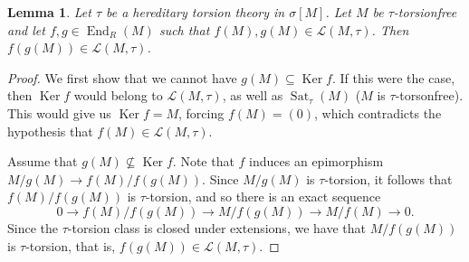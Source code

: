 \documentclass{amsart}
\newtheorem{lemma}[thm]{Lemma}
\newtheorem{cor}[thm]{Corollary}
\theoremstyle{definition}
\theoremstyle{remark}
\numberwithin{equation}{section}
\DeclareMathOperator{\Ker}{Ker}
\DeclareMathOperator{\Hom}{Hom}
\DeclareMathOperator{\End}{End}
\DeclareMathOperator{\Sat}{Sat}
\newcommand{\sm}{\sigma[M]}
\begin{document}
	
	\begin{lemma}\label{fgdens}
		Let $\tau$ be a hereditary torsion theory in $\sm$. 
		Let $M$ be $\tau$-torsionfree 
		and let $f,g\in\End_R(M)$ 
		such that $f(M),g(M)\in\mathcal{L}(M,\tau)$. 
		Then $f(g(M))\in\mathcal{L}(M,\tau)$.
	\end{lemma}
	
	\begin{proof}
		We first show that we cannot have $g(M)\subseteq \Ker f$. 
		If this were the case,
		then $\Ker f$ would belong to $\mathcal{L}(M,\tau)$, 
		as well as $\Sat_\tau(M)$ ($M$ is $\tau$-torsonfree). 
		This would give us $\Ker f = M$, forcing $f(M) = (0)$,
		which contradicts the hypothesis that $f(M)\in\mathcal{L}(M,\tau)$. 
		
		Assume that $g(M)\nsubseteq \Ker f$. 
		Note that $f$ induces an epimorphism $M/g(M)\to f(M)/f(g(M))$. 
		Since $M/g(M)$ is $\tau$-torsion, 
		it follows that $f(M)/f(g(M))$ is $\tau$-torsion, 
		and so there is an exact sequence
		\[0\to f(M)/f(g(M))\to M/f(g(M))\to M/f(M)\to 0.\]
		Since the $\tau$-torsion class is closed under extensions, 
		we have that $M/f(g(M))$ is $\tau$-torsion, 
		that is, $f(g(M))\in\mathcal{L}(M,\tau)$.
	\end{proof}
	
\end{document}
